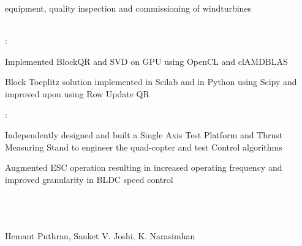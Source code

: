 \documentclass[]{hemant-style}
\begin{document}
\begin{minipage}[]{\textwidth}
\begin{minipage}{\textwidth}
\begin{minipage}[t][][c]{.75\textwidth}
\begin{hitemize}
                                equipment, quality inspection and commissioning of windturbines
                            \end{hitemize}
                            \vspace{1em}
                             \\
                            :
                            \begin{hitemize}
                                \item Implemented BlockQR and SVD on GPU using OpenCL and clAMDBLAS
                                \item Block Toeplitz solution implemented in Scilab and in Python using Scipy and improved upon using Row Update QR
                            \end{hitemize}
                            :
                            \begin{hitemize}
                                \item Independently designed and built a Single Axis Test Platform and Thrust Measuring Stand to engineer the quad-copter and test Control algorithms
                                \item Augmented ESC operation resulting in increased operating frequency  and improved granularity in BLDC speed control
                            \end{hitemize}
                            \vspace{1em}
                             \\
                            \\
                            \\
                            Hemant Puthran, Sanket V. Joshi, K. Narasimhan
                            \end{minipage}
                \end{minipage}
        \end{minipage}
        
    
\end{document}
